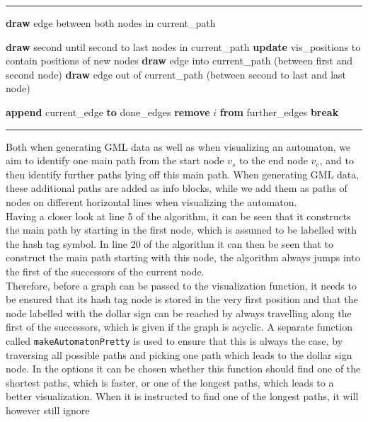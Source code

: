 \documentclass[a4paper,12pt,twoside,BCOR=10mm]{scrbook}
\makeatletter
\newenvironment{breakablealgorithm}
  {%
   \begin{center}
     \refstepcounter{algorithm}%
     \hrule height.8pt depth0pt \vspace{-0.45cm} \kern2pt%
     \renewcommand{\caption}[2][\relax]{%
       {\raggedright\textbf{\ALG@name~\thealgorithm} ##2\par}%
       \ifx\relax##1\relax %
         \addcontentsline{loa}{algorithm}{\protect\numberline{\thealgorithm}##2}%
       \else %
         \addcontentsline{loa}{algorithm}{\protect\numberline{\thealgorithm}##1}%
       \fi
       \kern2pt\hrule\kern2pt
     }
  }{%
     \kern2pt\hrule\relax%
   \end{center}
  }
\makeatother
\begin{document}
\begin{breakablealgorithm}
\begin{algorithmic}[1]

				\State \textbf{draw} edge between both nodes in current\_path

			\Else

				\State \textbf{draw} second until second to last nodes in current\_path
				\State \textbf{update} vis\_positions to contain positions of new nodes
				\State \textbf{draw} edge into current\_path (between first and second node)
				\State \textbf{draw} edge out of current\_path (between second to last and last node)

			\EndIf

			\State \textbf{append} current\_edge \textbf{to} done\_edges
			\State \textbf{remove} $ i $ \textbf{from} further\_edges
			\State \textbf{break}
		\EndIf
	\EndFor

\EndWhile

\end{algorithmic}
\end{breakablealgorithm}
Both when generating GML data as well as when visualizing an automaton,
we aim to identify one main path from the start node $ v_s $ to the end node $ v_e $,
and to then identify further paths lying off this main path. When generating GML data,
these additional paths are added as info blocks, while we add them as paths of nodes on
different horizontal lines when visualizing the automaton. \\
Having a closer look at line 5 of the algorithm,
it can be seen that it constructs the main path
by starting in the first node, which is assumed to
be labelled with the hash tag symbol.
In line 20 of the algorithm it can then be seen
that to construct the main path starting with this node,
the algorithm always jumps into the first of the successors of the current node. \\
Therefore, before a graph can be passed to the visualization function,
it needs to be ensured that its hash tag node is stored in the very first position
and that the node labelled with the dollar sign can be reached by always travelling
along the first of the successors, which is given if the graph is acyclic.
A separate function called \texttt{makeAutomatonPretty} is used to ensure that this is always the case,
by traversing all possible paths and picking one path which leads to the dollar sign node.
In the options it can be chosen whether this function
should find one of the shortest paths, which is faster, or one of the longest paths,
which leads to a better visualization.
When it is instructed to find one of the longest paths, it will however still ignore
\end{document}
